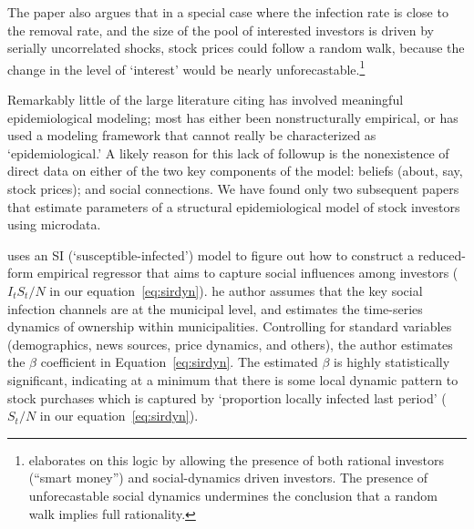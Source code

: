 The paper also argues that in a special case where the infection rate is close to the removal rate, and the size of the pool of interested investors is driven by serially uncorrelated shocks, stock prices could follow a random walk, because the change in the level of `interest' would be nearly unforecastable.\footnote{\cite{shiller1984stock} elaborates on this logic by allowing the presence of both rational investors (``smart money'') and social-dynamics driven investors. The presence of unforecastable social dynamics undermines the conclusion that a random walk implies full rationality.} %

Remarkably little of the large literature citing \cite{shiller1989survey} has involved meaningful epidemiological modeling; most has either been nonstructurally empirical, or has used a modeling framework that cannot really be characterized as `epidemiological.'
A likely reason for this lack of followup is the nonexistence of direct data on either of the two key components of the model: beliefs (about, say, stock prices); and social connections.  
We have found only two subsequent papers that estimate parameters of a structural epidemiological model of stock investors using microdata.

 uses an SI (`susceptible-infected') model to figure out how to construct a reduced-form empirical regressor that aims to capture social influences among investors ($I_tS_t/N$ in our equation~\eqref{eq:sirdyn}). he author assumes that the key social infection channels are at the municipal level, and estimates the time-series dynamics of ownership within municipalities.  Controlling for standard variables (demographics, news sources, price dynamics, and others), the author estimates the $\beta$ coefficient in Equation~\eqref{eq:sirdyn}.  The estimated $\beta$ is highly statistically significant, indicating at a minimum that there is some local dynamic pattern to stock purchases which is captured by `proportion locally infected last period' ($S_t/N$ in our equation~\eqref{eq:sirdyn}).

